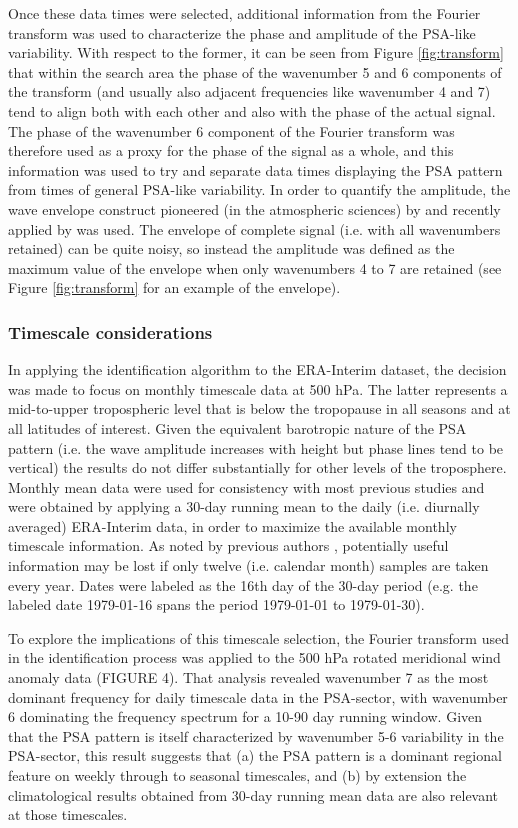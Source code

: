 Once these data times were selected, additional information from the Fourier transform was used to characterize the phase and amplitude of the PSA-like variability. With respect to the former, it can be seen from Figure \ref{fig:transform} that within the search area the phase of the wavenumber 5 and 6 components of the transform (and usually also adjacent frequencies like wavenumber 4 and 7) tend to align both with each other and also with the phase of the actual signal. The phase of the wavenumber 6 component of the Fourier transform was therefore used as a proxy for the phase of the signal as a whole, and this information was used to try and separate data times displaying the PSA pattern from times of general PSA-like variability. In order to quantify the amplitude, the wave envelope construct pioneered (in the atmospheric sciences) by \citet{Zimin2003} and recently applied by \citet{IrvingSimmonds2015} was used. The envelope of complete signal (i.e. with all wavenumbers retained) can be quite noisy, so instead the amplitude was defined as the maximum value of the envelope when only wavenumbers 4 to 7 are retained (see Figure \ref{fig:transform} for an example of the envelope).

\subsubsection{Timescale considerations}

In applying the identification algorithm to the ERA-Interim dataset, the decision was made to focus on monthly timescale data at 500 hPa. The latter represents a mid-to-upper tropospheric level that is below the tropopause in all seasons and at all latitudes of interest. Given the equivalent barotropic nature of the PSA pattern (i.e. the wave amplitude increases with height but phase lines tend to be vertical) the results do not differ substantially for other levels of the troposphere. Monthly mean data were used for consistency with most previous studies and were obtained by applying a 30-day running mean to the daily (i.e. diurnally averaged) ERA-Interim data, in order to maximize the available monthly timescale information. As noted by previous authors \citep[e.g.][]{Kidson1988}, potentially useful information may be lost if only twelve (i.e. calendar month) samples are taken every year. Dates were labeled as the 16th day of the 30-day period (e.g. the labeled date 1979-01-16 spans the period 1979-01-01 to 1979-01-30).

To explore the implications of this timescale selection, the Fourier transform used in the identification process was applied to the 500 hPa rotated meridional wind anomaly data (FIGURE 4). That analysis revealed wavenumber 7 as the most dominant frequency for daily timescale data in the PSA-sector, with wavenumber 6 dominating the frequency spectrum for a 10-90 day running window. Given that the PSA pattern is itself characterized by wavenumber 5-6 variability in the PSA-sector, this result suggests that (a) the PSA pattern is a dominant regional feature on weekly through to seasonal timescales, and (b) by extension the climatological results obtained from 30-day running mean data are also relevant at those timescales.

